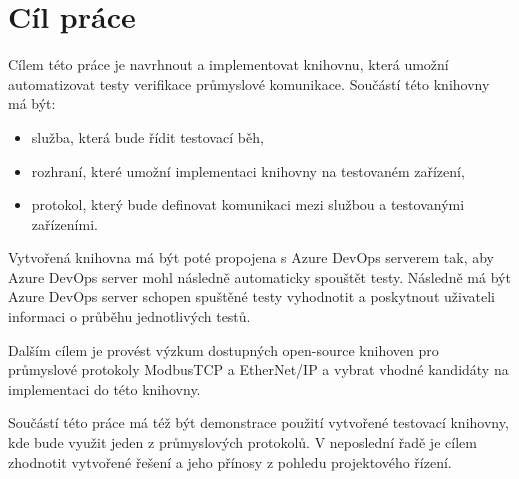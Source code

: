 \chapter{Cíl práce}\label{chap:cil}
Cílem této práce je navrhnout a implementovat knihovnu, která umožní automatizovat testy verifikace průmyslové komunikace. 
Součástí této knihovny má být:
\begin{itemize}
    \item služba, která bude řídit testovací běh,
    \item rozhraní, které umožní implementaci knihovny na testovaném zařízení,
    \item protokol, který bude definovat komunikaci mezi službou a testovanými zařízeními.
\end{itemize}
Vytvořená knihovna má být poté propojena s Azure DevOps serverem tak, aby Azure DevOps server mohl následně automaticky spouštět testy. Následně má být Azure DevOps server schopen spuštěné testy vyhodnotit a poskytnout uživateli informaci o průběhu jednotlivých testů. 

Dalším cílem je provést výzkum dostupných open-source knihoven pro průmyslové protokoly ModbusTCP a EtherNet/IP a vybrat vhodné kandidáty na implementaci do této knihovny. 

Součástí této práce má též být demonstrace použití vytvořené testovací knihovny, kde bude využit jeden z průmyslových protokolů. V neposlední řadě je cílem zhodnotit vytvořené řešení a jeho přínosy z pohledu projektového řízení.
